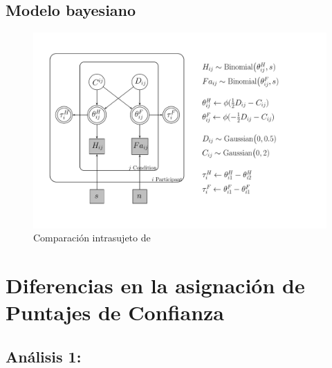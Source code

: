 \subsection{Modelo bayesiano}


\begin{figure}[th]
\centering
\includegraphics[width=1.1\textwidth]{Figures/Model_Tau_Diff_Tetas}
\caption[Modelo Tau: Modelo Bayesiano para evaluar las diferencias entre las tasas de hits y falsas alarmas]{Comparación intrasujeto de}
\label{fig:Mod_Tau}
\end{figure}














\section{Diferencias en la asignación de Puntajes de Confianza}

\subsection{Análisis 1: }

